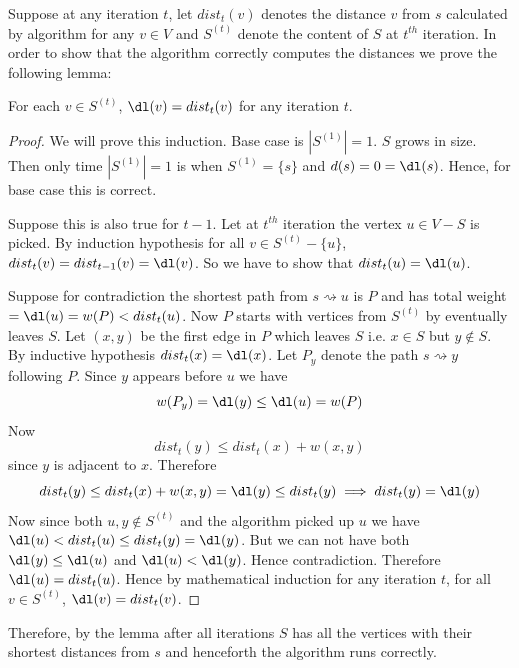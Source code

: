Suppose at any iteration $t$, let $dist_t(v)$ denotes the distance $v$ from $s$ calculated by algorithm for any $v\in V$ and $S^{(t)}$ denote the content of $S$ at $t^{th}$ iteration. In order to show that the algorithm correctly computes the distances we prove the following lemma:
\begin{Theorem}{}{}
	For each $v\in S^{(t)}$, $\dl(v)=dist_t(v)$ for any iteration $t$.
\end{Theorem}
\begin{proof}
	We will prove this induction. Base case is $|S^{(1)}|=1$. $S$ grows in size. Then only time $|S^{(1)}|=1$ is when $S^{(1)}=\{s\}$ and $d(s)=0=\dl(s)$. Hence, for base case this is correct.

	Suppose this is also true for $t-1$. Let at $t^{th}$ iteration the vertex $u\in V-S$ is picked. By induction hypothesis for all $v\in S^{(t)}-\{u\}$, $dist_t(v)=dist_{t-1}(v)=\dl(v)$. So we have to show that $dist_{t}(u)=\dl(u)$.

	Suppose for contradiction the shortest path from $s\rightsquigarrow u$ is $P$ and has total weight $=\dl(u)=w(P)<dist_t(u)$. Now $P$ starts with vertices from $S^{(t)}$ by eventually leaves $S$. Let $(x,y)$ be the first edge in $P$ which leaves $S$ i.e. $x\in S$ but $y\notin S$. By inductive hypothesis $dist_t(x)=\dl(x)$. Let $P_y$ denote the path $s\rightsquigarrow y$ following $P$. Since $y$ appears before $u$ we have $$w(P_y)=\dl(y)\leq \dl(u)=w(P)$$Now $$dist_t(y)\leq dist_t(x)+w(x,y)$$ since $y$ is adjacent to $x$. Therefore $$dist_t(y)\leq dist_t(x)+w(x,y)=\dl(y)\leq dist_t(y)\implies dist_t(y)=\dl(y)$$Now since both $u,y\notin S^{(t)}$ and the algorithm picked up $u$ we have $\dl(u)<dist_t(u)\leq dist_t(y)=\dl(y)$. But we can not have both $\dl(y)\leq \dl(u)$ and $\dl(u)<\dl(y)$. Hence contradiction. Therefore $\dl(u)=dist_t(u)$. Hence by mathematical induction for any iteration $t$, for all $v\in S^{(t)}$, $\dl(v)=dist_t(v)$.
\end{proof}

Therefore, by the lemma  after all iterations $S$ has all the vertices with their shortest distances from $s$ and henceforth the algorithm runs correctly.

